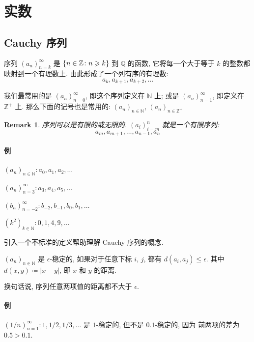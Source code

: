 \documentclass[UTF8]{ctexart}
\theoremstyle{mystyle}
\theoremstyle{myremark}
\newtheorem*{remark}{Remark}
\theoremstyle{plain}
\newcommand{\Z}{\mathbb Z}
\newcommand{\N}{\mathbb N}
\newcommand{\Q}{\mathbb Q}
\DeclarePairedDelimiter\set{\{}{\}}
\begin{document}
\section{实数}
\subsection{Cauchy 序列}
\begin{definition}
    序列 $ (a_n)_{n = k}^\infty $ 是 $ \set{n \in \Z \colon n \geqslant k} $ 到 $ \Q $ 的函数, 它将每一个大于等于 $ k $ 的整数都映射到一个有理数上. 由此形成了一个列有序的有理数: \[ a_{k}, a_{k + 1}, a_{k + 2}, \dots \]
\end{definition}

我们最常用的是 $ (a_n)_{n = 0}^\infty $, 即这个序列定义在 $ \N $ 上; 或是 $ (a_n)_{n = 1}^\infty $, 即定义在 $ \Z^+ $ 上. 那么下面的记号也是常用的: $ (a_n)_{n \in \N} $, $ (a_n)_{n \in \Z^+} $

\begin{remark}
    序列可以是有限的或无限的. $ (a_i)_{i = m}^n $ 就是一个有限序列: \[ a_{m}, a_{m + 1}, \dots, a_{n - 1}, a_n \]
\end{remark}

\paragraph{例}
$ (a_n)_{n \in \N} \colon a_0, a_1, a_2, \dots $

$ (a_n)_{n = 3}^\infty \colon a_3, a_4, a_5, \dots $

$ (b_n)_{n = -2}^\infty \colon b_{-2}, b_{-1}, b_0, b_1, \dots $

$ (k^2)_{k \in \N} \colon 0, 1, 4, 9, \dots $


引入一个不标准的定义帮助理解 Cauchy 序列的概念.

\begin{definition}
    $ (a_n)_{n \in \N} $ 是 $ \epsilon $-稳定的, 如果对于任意下标 $ i $, $ j $, 都有 $ d(a_i, a_j) \leqslant \epsilon $. 其中 $ d(x, y) \coloneqq |x - y| $, 即 $ x $ 和 $ y $ 的距离.
\end{definition}

换句话说, 序列任意两项值的距离都不大于 $ \epsilon $.

\paragraph{例}
$ (1/n)_{n = 1}^\infty \colon 1, 1/2, 1/3, \dots $ 是 $ 1 $-稳定的, 但不是 $ 0.1 $-稳定的, 因为 前两项的差为 $ 0.5 > 0.1 $.
\end{document}
